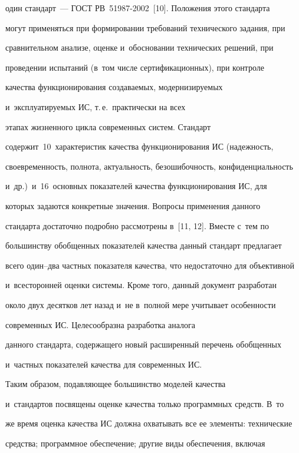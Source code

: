 один стандарт~--- ГОСТ РВ~51987-2002~[10]. Положения этого стандарта 

могут применяться при формировании требований технического задания, при 

сравнительном анализе, оценке и~обосновании технических решений, при 

проведении испытаний (в~том чис\-ле сертификационных), при контроле 

качества функционирования создаваемых, модернизируемых 

и~эксплуатируемых ИС, т.\,е.\ практически на всех 

этапах жиз\-нен\-но\-го цик\-ла современных сис\-тем. Стандарт 

содержит~10~характеристик качества функционирования ИС (надежность, 

своевременность, полнота, актуальность, безошибочность, конфиденциальность 

и~др.)\ и~16~основных показателей качества функционирования ИС, для 

которых задаются конкретные значения. Вопросы применения данного 

стандарта достаточно подробно рас\-смот\-ре\-ны в~[11, 12]. Вместе с~тем по 

большинству обобщенных показателей качества данный стандарт предлагает 

всего один--два част\-ных показателя качества, что недостаточно для объективной 

и~всесторонней оценки сис\-те\-мы. Кроме того, данный документ разработан 

около двух десятков лет назад и~не в~полной мере учитывает особенности 

современных ИС. Целесообразна разработка аналога 

данного стандарта, содержащего новый расширенный перечень обобщенных 

и~частных показателей качества для современных ИС.

{



}

     

     Таким образом, подавляющее большинство моделей качества 

и~стандартов посвящены оценке качества только программных средств. В~то 

же время оценка качества ИС должна охватывать все ее элементы: технические 

средства; программное обеспечение; другие виды обеспечения, включая 

